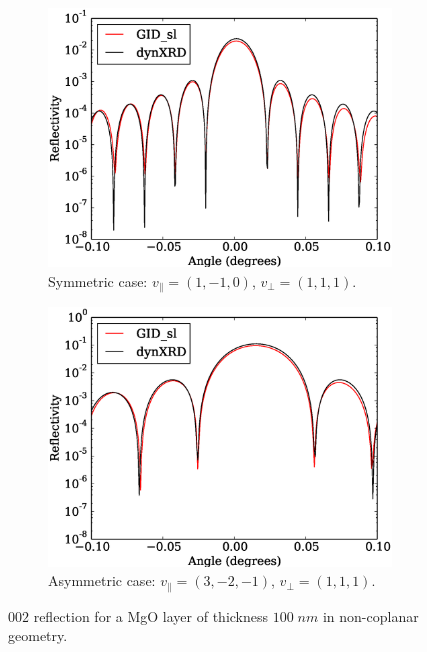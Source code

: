\documentclass[12pt,oneside,notitlepage,abstracton,a4paper]{scrartcl}
\begin{document}
\begin{figure}[h]
 \centering
 \begin{subfigure}[h]{0.49\textwidth}
  \includegraphics[width=\textwidth]{pics/test2.eps}
  \caption{Symmetric case: $v_\parallel=(1, -1, 0)$, $v_\perp=(1,1,1)$.}
  \label{test2}
 \end{subfigure}
 \begin{subfigure}[h]{0.49\textwidth}
  \includegraphics[width=\textwidth]{pics/test7.eps}
  \caption{Asymmetric case: $v_\parallel=(3, -2, -1)$, $v_\perp=(1,1,1)$.}
  \label{test7}
 \end{subfigure}
 \caption{$002$ reflection for a MgO layer of thickness $100\;nm$ in non-coplanar geometry.}\label{testsMgO}
\end{figure}
\end{document}
